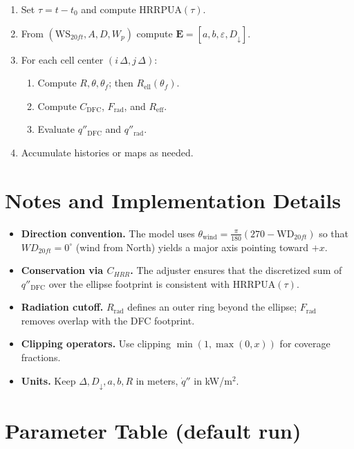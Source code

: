 \documentclass[a4paper,12pt]{article}
\begin{document}
\begin{enumerate}[leftmargin=1.5em]
  \item Set $\tau=t- t_0$ and compute $\mathrm{HRRPUA}(\tau)$.
  \item From $(\mathrm{WS}_{20ft},A,D,W_p)$ compute $\mathbf{E}=[a,b,\varepsilon,D_\downarrow]$.
  \item For each cell center $(i\,\Delta, j\,\Delta)$:
  \begin{enumerate}[label*=\arabic*.]
    \item Compute $R,\theta,\theta_f$; then $R_{\mathrm{ell}}(\theta_f)$.
    \item Compute $C_{\mathrm{DFC}}$, $F_{\mathrm{rad}}$, and $R_{\mathrm{eff}}$.
    \item Evaluate $q''_{\mathrm{DFC}}$ and $q''_{\mathrm{rad}}$.
  \end{enumerate}
  \item Accumulate histories or maps as needed.
\end{enumerate}

\section{Notes and Implementation Details}

\begin{itemize}[leftmargin=1.5em]
  \item \textbf{Direction convention.} The model uses $\theta_{\mathrm{wind}}=\tfrac{\pi}{180}(270-\mathrm{WD}_{20ft})$ so that $WD_{20ft}=0^\circ$ (wind from North) yields a major axis pointing toward $+x$.
  \item \textbf{Conservation via $C_{HRR}$.} The adjuster ensures that the discretized sum of $q''_{\mathrm{DFC}}$ over the ellipse footprint is consistent with $\mathrm{HRRPUA}(\tau)$.
  \item \textbf{Radiation cutoff.} $R_{\mathrm{rad}}$ defines an outer ring beyond the ellipse; $F_{\mathrm{rad}}$ removes overlap with the DFC footprint.
  \item \textbf{Clipping operators.} Use clipping $\min(1,\max(0,x))$ for coverage fractions.
  \item \textbf{Units.} Keep $\Delta, D_\downarrow, a, b, R$ in meters, $\dot q''$ in kW/m$^2$.
\end{itemize}

\section{Parameter Table (default run)}
\end{document}
